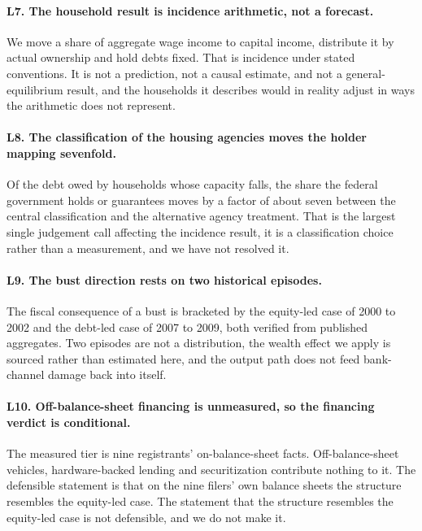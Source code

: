 \paragraph{L7. The household result is incidence arithmetic, not a forecast.} We move a share of
aggregate wage income to capital income, distribute it by actual ownership and hold debts fixed.
That is incidence under stated conventions. It is not a prediction, not a causal estimate, and
not a general-equilibrium result, and the households it describes would in reality adjust in ways
the arithmetic does not represent.

\paragraph{L8. The classification of the housing agencies moves the holder mapping sevenfold.}
Of the debt owed by households whose capacity falls, the share the federal government holds or
guarantees moves by a factor of about seven between the central classification and the
alternative agency treatment. That is the largest single judgement call affecting the incidence
result, it is a classification choice rather than a measurement, and we have not resolved it.

\paragraph{L9. The bust direction rests on two historical episodes.} The fiscal consequence of a
bust is bracketed by the equity-led case of 2000 to 2002 and the debt-led case of 2007 to 2009,
both verified from published aggregates. Two episodes are not a distribution, the wealth effect
we apply is sourced rather than estimated here, and the output path does not feed bank-channel
damage back into itself.

\paragraph{L10. Off-balance-sheet financing is unmeasured, so the financing verdict is
conditional.} The measured tier is nine registrants' on-balance-sheet facts. Off-balance-sheet
vehicles, hardware-backed lending and securitization contribute nothing to it. The defensible
statement is that on the nine filers' own balance sheets the structure resembles the equity-led
case. The statement that the structure resembles the equity-led case is not defensible, and we do
not make it.

